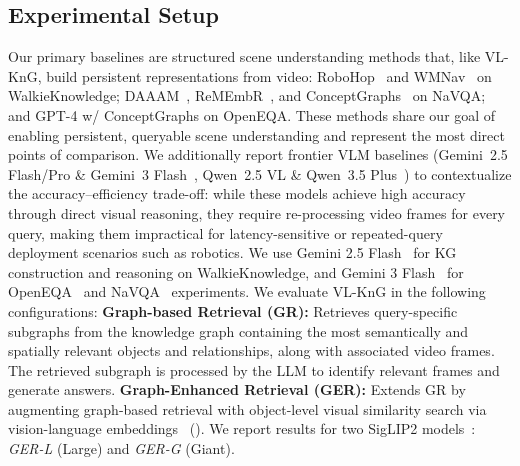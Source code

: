 \subsection{Experimental Setup}
Our primary baselines are structured scene understanding methods that, like VL-KnG, build persistent representations from video: RoboHop~\cite{garg2024robohop} and WMNav~\cite{nie2025wmnav} on WalkieKnowledge; DAAAM~\cite{daaam2025arxiv}, ReMEmbR~\cite{anwar2024remembr}, and ConceptGraphs~\cite{gu2024conceptgraphs} on NaVQA; and GPT-4 w/ ConceptGraphs on OpenEQA. These methods share our goal of enabling persistent, queryable scene understanding and represent the most direct points of comparison. We additionally report frontier VLM baselines (Gemini~2.5 Flash/Pro \& Gemini~3 Flash~\cite{comanici2025gemini}, Qwen~2.5 VL \& Qwen~3.5 Plus~\cite{bai2025qwen2}) to contextualize the accuracy–efficiency trade-off: while these models achieve high accuracy through direct visual reasoning, they require re-processing video frames for every query, making them impractical for latency-sensitive or repeated-query deployment scenarios such as robotics.
We use Gemini 2.5 Flash~\cite{comanici2025gemini} for KG construction and reasoning on WalkieKnowledge, and Gemini 3 Flash~\cite{comanici2025gemini} for OpenEQA~\cite{majumdar2024openeqa} and NaVQA~\cite{navq2025iccv} experiments.
We evaluate VL-KnG in the following configurations:
\textbf{Graph-based Retrieval (GR):} Retrieves query-specific subgraphs from the knowledge graph containing the most semantically and spatially relevant objects and relationships, along with associated video frames. The retrieved subgraph is processed by the LLM to identify relevant frames and generate answers.
\textbf{Graph-Enhanced Retrieval (GER):}
Extends GR by augmenting graph-based retrieval with object-level visual similarity search via vision-language embeddings~\cite{tschannen2025siglip} ().
We report results for two SigLIP2 models~\cite{tschannen2025siglip}:
\emph{GER-L} (Large) and \emph{GER-G} (Giant).

